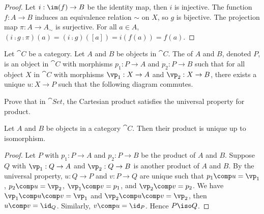 \documentclass[10pt]{article}
\begin{document}
\begin{proof}
    Let $i:\im(f)\to B$ be the identity map, then $i$ is injective. The function $f:A\to B$ induces an equivalence relation $\sim$ on $X$, so $g$ is bijective. The projection map $\pi:A\to{A}_{\sim}$ is surjective. For all $a\in A$, $(i\comp g\comp\pi)(a)=(i\comp g)([a])=i(f(a))=f(a)$. 
\end{proof}
\begin{definition}
    Let $\cat{C}$ be a category. Let $A$ and $B$ be objects in $\cat{C}$. The  of $A$ and $B$, denoted $P$, is an object in $\cat{C}$ with morphisms ${p}_{1}:P\to A$ and ${p}_{2}:P\to B$ such that for all object $X$ in $\cat{C}$ with morphisms ${\vp}_{1}:X\to A$ and ${\vp}_{2}:X\to B$, there exists a unique $u:X\to P$ such that the following diagram commutes.
\end{definition}
\begin{center}
\end{center}
\begin{problem}
    Prove that in $\cat{Set}$, the Cartesian product satisfies the universal property for product.
\end{problem}
\begin{proposition}
    Let $A$ and $B$ be objects in a category $\cat{C}$. Then their product is unique up to isomorphism.
\end{proposition}
\begin{proof}
    Let $P$ with ${p}_{1}:P\to A$ and ${p}_{2}:P\to B$ be the product of $A$ and $B$. Suppose $Q$ with ${\vp}_{1}:Q\to A$ and ${\vp}_{2}:Q\to B$ is another product of $A$ and $B$. By the universal property, $u:Q\to P$ and $v:P\to Q$ are unique such that ${p}_{1}\comp u={\vp}_{1}$, ${p}_{2}\comp u={\vp}_{2}$, ${\vp}_{1}\comp v={p}_{1}$, and ${\vp}_{2}\comp v={p}_{2}$. We have ${\vp}_{1}\comp u\comp v={\vp}_{1}$ and ${\vp}_{2}\comp u\comp v={\vp}_{2}$, then $u\comp v={\id}_{Q}$. Similarly, $v\comp u={\id}_{P}$. Hence $P\iso Q$.
\end{proof}
\begin{center}
\end{center}
\end{document}

